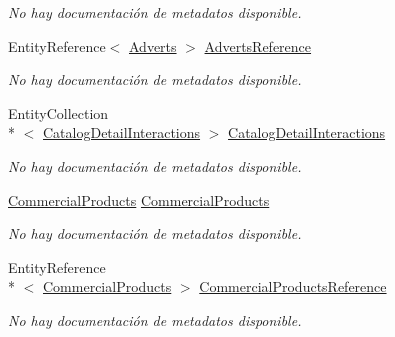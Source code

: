 \begin{DoxyCompactItemize}
\begin{DoxyCompactList}\small\item\em No hay documentación de metadatos disponible. \end{DoxyCompactList}\item 
Entity\-Reference$<$ \hyperlink{class_microsoft_1_1_samples_1_1_kinect_1_1_basic_interactions_1_1_adverts}{Adverts} $>$ \hyperlink{class_microsoft_1_1_samples_1_1_kinect_1_1_basic_interactions_1_1_catalog_details_a2420e90f9246a5ddb526f9eb5e6842b3}{Adverts\-Reference}
\begin{DoxyCompactList}\small\item\em No hay documentación de metadatos disponible. \end{DoxyCompactList}\item 
Entity\-Collection\\*
$<$ \hyperlink{class_microsoft_1_1_samples_1_1_kinect_1_1_basic_interactions_1_1_catalog_detail_interactions}{Catalog\-Detail\-Interactions} $>$ \hyperlink{class_microsoft_1_1_samples_1_1_kinect_1_1_basic_interactions_1_1_catalog_details_a366990254d49115e49e920821958988f}{Catalog\-Detail\-Interactions}
\begin{DoxyCompactList}\small\item\em No hay documentación de metadatos disponible. \end{DoxyCompactList}\item 
\hyperlink{class_microsoft_1_1_samples_1_1_kinect_1_1_basic_interactions_1_1_commercial_products}{Commercial\-Products} \hyperlink{class_microsoft_1_1_samples_1_1_kinect_1_1_basic_interactions_1_1_catalog_details_a990a68e8dd0891352b5f9f2a138e911e}{Commercial\-Products}
\begin{DoxyCompactList}\small\item\em No hay documentación de metadatos disponible. \end{DoxyCompactList}\item 
Entity\-Reference\\*
$<$ \hyperlink{class_microsoft_1_1_samples_1_1_kinect_1_1_basic_interactions_1_1_commercial_products}{Commercial\-Products} $>$ \hyperlink{class_microsoft_1_1_samples_1_1_kinect_1_1_basic_interactions_1_1_catalog_details_a5f5e4bad602e8fb5d87233c5120dae01}{Commercial\-Products\-Reference}
\begin{DoxyCompactList}\small\item\em No hay documentación de metadatos disponible. \end{DoxyCompactList}\end{DoxyCompactItemize}


